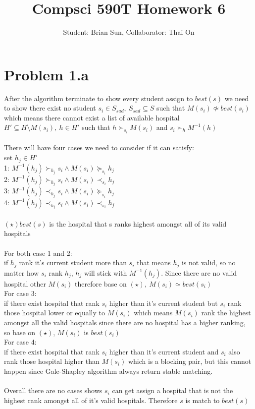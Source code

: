 \documentclass{article}
\title{Compsci 590T Homework 6}
\author{Student: Brian Sun, Collaborator: Thai On}
\date{}
\begin{document}
\maketitle


\section{Problem 1.a}
After the algorithm terminate to show every student assign to $best(s)$ we need to show there exist no student $s_i \in S_{sad},\ S_{sad} \subseteq S$ such that $M(s_i) \not \simeq best(s_i)$ which means there cannot exist a list of available hospital $H'\subseteq H\setminus M(s_i),\ h\in H'$ such that $h\succ_{s_i} M(s_i)$ and $s_i\succ_{h} M^{-1}(h)$\\\\
There will have four cases we need to consider if it can satisfy:\\
set $h_j \in H'$\\
1: $M^{-1}(h_j) \succ_{h_j} s_i \wedge M(s_i) \succeq_{s_i} h_j$\\
2: $M^{-1}(h_j) \succ_{h_j} s_i \wedge M(s_i) \prec_{s_i} h_j$\\
3: $M^{-1}(h_j) \prec_{h_j} s_i \wedge M(s_i) \succeq_{s_i} h_j$\\
4: $M^{-1}(h_j) \prec_{h_j} s_i \wedge M(s_i) \prec_{s_i} h_j$\\\\
$(\star) best(s)$ is the hospital that s ranks highest amongst all of its valid hospitals\\\\
For both case 1 and 2:\\
if $h_j$ rank it's current student more than $s_i$ that means $h_j$ is not valid, so no matter how $s_i$ rank $h_j$, $h_j$ will stick with $M^{-1}(h_j)$. Since there are no valid hospital other $M(s_i)$ therefore base on $(\star),\ M(s_i) \simeq best(s_i)$\\
For case 3:\\
if there exist hospital that rank $s_i$ higher than it's current student but $s_i$ rank those hospital lower or equally to $M(s_i)$ which means $M(s_i)$ rank the highest amongst all the valid hospitals since there are no hospital has a higher ranking, so base on $(\star)$, $M(s_i)$ is $best(s_i)$\\
For case 4:\\
if there exist hospital that rank $s_i$ higher than it's current student and $s_i$ also rank those hospital higher than $M(s_i)$ which is a blocking pair, but this cannot happen since Gale-Shapley algorithm always return stable matching.\\\\
Overall there are no cases shows $s_i$ can get assign a hospital that is not the highest rank amongst all of it's valid hospitals.
Therefore $s$ is match to $best(s)$
\end{document}
